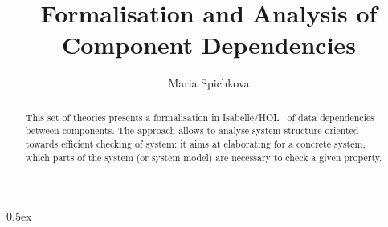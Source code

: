 \documentclass[11pt,a4paper]{article}
\begin{document}
\newcommand{\idep}{\mathbb{I}^\mathcal{D}}
\newcommand{\odep}{\mathbb{O}^\mathcal{D}}
\newcommand{\instreams}{\mathbb{I}}
\newcommand{\outstreams}{\mathbb{O}}


\title{Formalisation and Analysis of Component Dependencies}
\author{Maria Spichkova}
\maketitle


\begin{abstract}
This set of theories presents a formalisation in Isabelle/HOL~\cite{npw} of data dependencies between components. 
The approach allows to analyse system structure oriented towards efficient checking of system: 
it aims at elaborating for a concrete system, which parts of 
the system (or system model) are necessary to check a given property. 
\end{abstract}
\tableofcontents

\newpage



\parindent 0pt\parskip 0.5ex

\newpage




\end{document}
